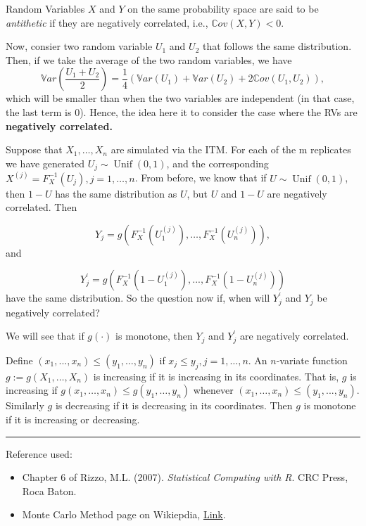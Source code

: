 \documentclass[
  letterpaper,
  DIV=11,
  numbers=noendperiod]{scrreprt}
\begin{document}
{Random Variables \(X\) and \(Y\) on the same probability space are said
to be \emph{antithetic} if they are negatively correlated, i.e.,
\(\mathbb{C}ov(X,Y) < 0\).

Now, consier two random variable \(U_1\) and \(U_2\) that follows the
same distribution. Then, if we take the average of the two random
variables, we have \[
\mathbb{V}ar\left(\frac{U_1 + U_2}{2}\right) = \frac{1}{4} \left(\mathbb{V}ar(U_1) + \mathbb{V}ar(U_2) + 2\mathbb{C}ov(U_1,U_2)\right),
\] which will be smaller than when the two variables are independent (in
that case, the last term is 0). Hence, the idea here it to consider the
case where the RVs are \textbf{negatively correlated.}

Suppose that \(X_1, \dots , X_n\) are simulated via the ITM. For each of
the m replicates we have generated \(U_j \sim\operatorname{Unif}(0,1)\),
and the corresponding \(X^{(j)} = F^{−1}_X(U_j), j = 1, \dots, n\). From
before, we know that if \(U\sim\operatorname{Unif}(0,1)\), then
\(1 − U\) has the same distribution as \(U\), but \(U\) and \(1 − U\)
are negatively correlated. Then

\[ Y_j = g(F^{−1}_X(U^{(j)}_1 ), \dots , F^{−1}_X(U_n^{(j)})),\] and

\[ Y_j^\prime = g(F^{−1}_X(1-U^{(j)}_1 ), . . . , F^{−1}_X(1-U_n^{(j)}))\]
have the same distribution. So the question now if, when will
\(Y_j^{\prime}\) and \(Y_j\) be negatively correlated?

We will see that if \(g(\cdot)\) is monotone, then \(Y_j\) and
\(Y_j^{\prime}\) are negatively correlated.

Define \((x_1, . . . , x_n) \le (y_1, \dots , y_n)\) if
\(x_j ≤ y_j, j = 1, \dots, n\). An \(n\)-variate function
\(g := g(X_1, \dots, X_n)\) is increasing if it is increasing in its
coordinates. That is, \(g\) is increasing if
\(g(x_1,\dots, x_n) \le g(y_1, \dots, y_n)\) whenever
\((x_1, \dots , x_n) \le (y_1, . . . , y_n)\). Similarly \(g\) is
decreasing if it is decreasing in its coordinates. Then \(g\) is
monotone if it is increasing or decreasing.

\begin{center}\rule{0.5\linewidth}{0.5pt}\end{center}

Reference used:

\begin{itemize}
\item
  Chapter 6 of Rizzo, M.L. (2007). \emph{Statistical Computing with R}.
  CRC Press, Roca Baton.
\item
  Monte Carlo Method page on Wikiepdia,
  \href{https://en.wikipedia.org/wiki/Monte_Carlo_method}{Link}.
\end{itemize}

}
\end{document}
